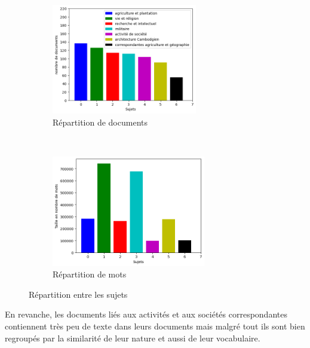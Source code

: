 \begin{figure}[]
    \centering
    \begin{subfigure}[t]{0.45\textwidth}
        \centering
        \includegraphics[height=1.9in]{img/6topic_size_docs.png}
        \caption{Répartition de documents}
    \end{subfigure}%
    ~ 
    \begin{subfigure}[t]{0.45\textwidth}
        \centering
        \includegraphics[height=1.9in]{img/6topic_size_words_true.png}
        \caption{Répartition de mots}
    \end{subfigure}
    \caption{Répartition entre les sujets}
    \label{fig:repartition_7topics}
\end{figure}

En revanche, les documents liés aux activités et aux sociétés correspondantes contiennent très peu de texte dans leurs documents mais malgré tout ils sont bien regroupés par la similarité de leur nature et aussi de leur vocabulaire.


